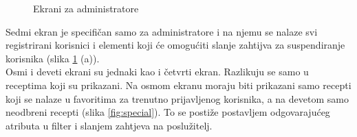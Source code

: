 \documentclass[times, utf8, zavrsni]{fer}
\begin{document}
\begin{figure}[h]
      \centering
      \caption{Ekrani za administratore}
      \label{fig:Single recipe}
\end{figure}\newpage
Sedmi ekran je specifičan samo za administratore i na njemu se nalaze svi registrirani korisnici
i elementi koji će omogućiti slanje zahtijva za suspendiranje korisnika (slika \ref*{fig:Single recipe} (a)).\\
Osmi i deveti ekrani su jednaki kao i četvrti ekran. Razlikuju se samo u receptima koji su prikazani.
Na osmom ekranu moraju biti prikazani samo recepti koji se nalaze u favoritima za trenutno prijavljenog korisnika, a na devetom
samo neodbreni recepti (slika \ref{fig:special}).
To se postiže postavljem odgovarajućeg atributa u filter i slanjem zahtjeva na poslužitelj.
\end{document}
